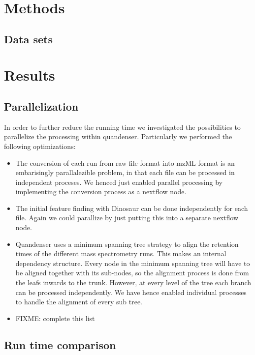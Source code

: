 \documentclass[11pt]{article}
\begin{document}
\section*{Methods}

\subsection*{Data sets}

\section*{Results}

\subsection*{Parallelization}
In order to further reduce the running time we investigated the possibilities to parallelize the processing within quandenser. Particularly we performed the following optimizations:
\begin{itemize}
  \item The conversion of each run from raw file-format into mzML-format is an embarisingly parallalezible problem, in that each file can be processed in independent proceses. We henced just enabled parallel processing by implementing the conversion process as a nextflow node.
  \item The initial feature finding with Dinosaur\cite{teleman2016dinosaur} can be done independently for each file. Again we could parallize by just putting this into a separate nextflow node.
  \item Quandenser uses a minimum spanning tree strategy \cite{rost2016tric} to align the retention times of the different mass spectrometry runs. This makes an internal dependency structure. Every node in the minimum spanning tree will have to be aligned together with its sub-nodes, so the alignment process is done from the leafs inwards to the trunk.  However, at every level of the tree each branch can be processed independently. We have hence enabled individual processes to handle the alignment of every sub tree.
  \item FIXME: complete this list
\end{itemize}

\subsection*{Run time comparison}
\end{document}
